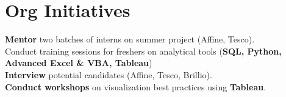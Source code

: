 \section{Org Initiatives}
  \begin{itemize}[leftmargin=0.1in, label={}]
    \normalsize{
      \item{
        \textbf{Mentor} two batches of interns on summer project (Affine, Tesco). \\
        Conduct training sessions for freshers on analytical tools (\textbf{SQL, Python, Advanced Excel \& VBA, Tableau}) \\
        \textbf{Interview} potential candidates (Affine, Tesco, Brillio). \\
        \textbf{Conduct workshops} on visualization best practices using \textbf{Tableau}.
      }
    }
  \end{itemize}
